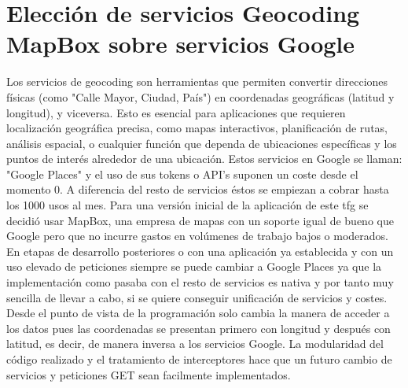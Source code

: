 \section{Elección de servicios Geocoding MapBox sobre servicios Google}
Los servicios de geocoding son herramientas que permiten convertir direcciones físicas (como "Calle Mayor, Ciudad, País") en coordenadas geográficas (latitud y longitud), y viceversa. Esto es esencial para aplicaciones que requieren localización geográfica precisa, como mapas interactivos, planificación de rutas, análisis espacial, o cualquier función que dependa de ubicaciones específicas y los puntos de interés alrededor de una ubicación. Estos servicios en Google se llaman: "Google Places" y el uso de sus tokens o API's suponen un coste desde el momento 0. A diferencia del resto de servicios éstos se empiezan a cobrar hasta los 1000 usos al mes. 
Para una versión inicial de la aplicación de este \acrshort{tfg} se decidió usar MapBox, una empresa de mapas con un soporte igual de bueno que Google pero que no incurre gastos en volúmenes de trabajo bajos o moderados. 
En etapas de desarrollo posteriores o con una aplicación ya establecida y con un uso elevado de peticiones siempre se puede cambiar a Google Places ya que la implementación como pasaba con el resto de servicios es nativa y por tanto muy sencilla de llevar a cabo, si se quiere conseguir unificación de servicios y costes. Desde el punto de vista de la programación solo cambia la manera de acceder a los datos pues las coordenadas se presentan primero con longitud y después con latitud, es decir, de manera inversa a los servicios Google. La modularidad del código realizado y el tratamiento de interceptores hace que un futuro cambio de servicios y peticiones GET sean facilmente implementados.
